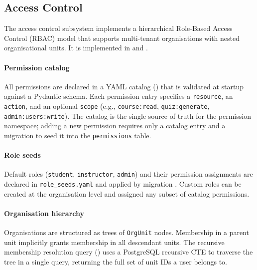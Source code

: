 \subsection{Access Control}
\label{sec:impl_access_control}

The access control subsystem implements a hierarchical Role-Based Access Control (RBAC) model that supports multi-tenant organisations with nested organisational units. It is implemented in  and .

\paragraph{Permission catalog}
All permissions are declared in a YAML catalog () that is validated at startup against a Pydantic schema. Each permission entry specifies a \texttt{resource}, an \texttt{action}, and an optional \texttt{scope} (e.g., \texttt{course:read}, \texttt{quiz:generate}, \texttt{admin:users:write}). The catalog is the single source of truth for the permission namespace; adding a new permission requires only a catalog entry and a migration to seed it into the \texttt{permissions} table.

\paragraph{Role seeds}
Default roles (\texttt{student}, \texttt{instructor}, \texttt{admin}) and their permission assignments are declared in \texttt{role\_seeds.yaml} and applied by migration . Custom roles can be created at the organisation level and assigned any subset of catalog permissions.

\paragraph{Organisation hierarchy}
Organisations are structured as trees of \texttt{OrgUnit} nodes. Membership in a parent unit implicitly grants membership in all descendant units. The recursive membership resolution query () uses a PostgreSQL recursive CTE to traverse the tree in a single query, returning the full set of unit IDs a user belongs to.

